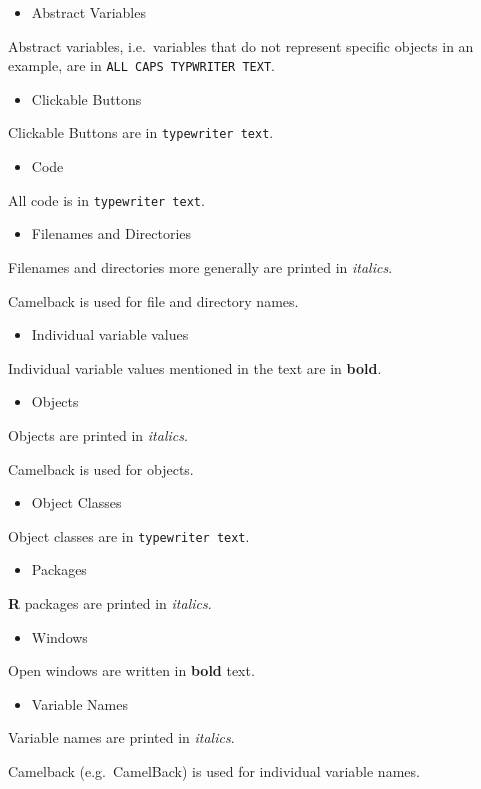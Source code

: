 \begin{itemize}
\item
  Abstract Variables
\end{itemize}
Abstract variables, i.e.~variables that do not represent specific
objects in an example, are in \texttt{ALL CAPS TYPWRITER TEXT}.

\begin{itemize}
\item
  Clickable Buttons
\end{itemize}
Clickable Buttons are in \texttt{typewriter text}.

\begin{itemize}
\item
  Code
\end{itemize}
All code is in \texttt{typewriter text}.

\begin{itemize}
\item
  Filenames and Directories
\end{itemize}
Filenames and directories more generally are printed in \emph{italics}.

Camelback is used for file and directory names.

\begin{itemize}
\item
  Individual variable values
\end{itemize}
Individual variable values mentioned in the text are in \textbf{bold}.

\begin{itemize}
\item
  Objects
\end{itemize}
Objects are printed in \emph{italics}.

Camelback is used for objects.

\begin{itemize}
\item
  Object Classes
\end{itemize}
Object classes are in \texttt{typewriter text}.

\begin{itemize}
\item
  Packages
\end{itemize}
\textbf{R} packages are printed in \emph{italics}.

\begin{itemize}
\item
  Windows
\end{itemize}
Open windows are written in \textbf{bold} text.

\begin{itemize}
\item
  Variable Names
\end{itemize}
Variable names are printed in \emph{italics}.

Camelback (e.g.~CamelBack) is used for individual variable names.
